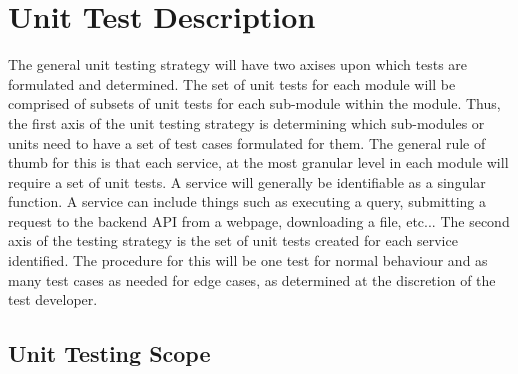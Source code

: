 \documentclass[12pt, titlepage]{article}
\begin{document}
\begin{flushleft}
\begin{longtable}{|l|p{10cm}|}
\end{longtable}



\section{Unit Test Description}




The general unit testing strategy will have two axises upon which tests are formulated and determined.
The set of unit tests for each module will be comprised of subsets
of unit tests for each sub-module within the module. Thus, the first axis of the unit testing strategy is
determining which sub-modules or units need to have a set of test cases formulated for them. The general rule
of thumb for this is that each service, at the most granular level in each module will require a set of unit tests.
A service will generally be identifiable as a singular function. A service can include things such as executing a query,
submitting a request to the backend API from a webpage, downloading a file, etc... The second axis of the testing strategy
is the set of unit tests created for each service identified. The procedure for this will be one test for normal behaviour
and as many test cases as needed for edge cases, as determined at the discretion of the test developer.

\subsection{Unit Testing Scope}


\end{flushleft}
\end{document}

